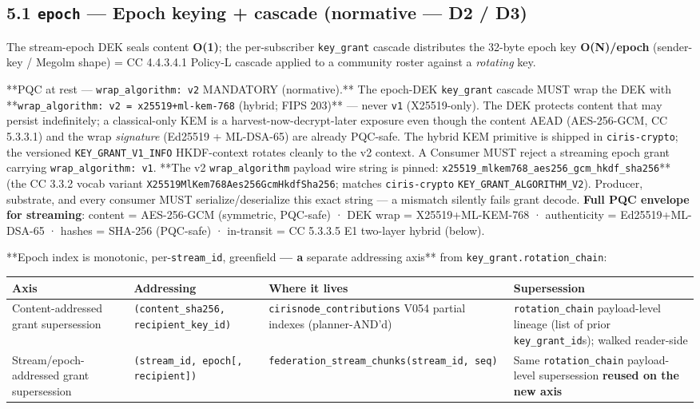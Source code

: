 \documentclass[11pt]{article}
\begin{document}
\subsection*{5.1 \texttt{epoch} — Epoch keying + cascade (normative — D2 / D3)}


The stream-epoch DEK seals content \textbf{O(1)}; the per-subscriber \texttt{key\_grant} cascade distributes the 32-byte epoch key \textbf{O(N)/epoch} (sender-key / Megolm shape) = CC 4.4.3.4.1 Policy-L cascade applied to a community roster against a \textit{rotating} key.


**PQC at rest — \texttt{wrap\_algorithm: v2} MANDATORY (normative).** The epoch-DEK \texttt{key\_grant} cascade MUST wrap the DEK with **\texttt{wrap\_algorithm: v2 = x25519+ml-kem-768} (hybrid; FIPS 203)** — never \texttt{v1} (X25519-only). The DEK protects content that may persist indefinitely; a classical-only KEM is a harvest-now-decrypt-later exposure even though the content AEAD (AES-256-GCM, CC 5.3.3.1) and the wrap \textit{signature} (Ed25519 + ML-DSA-65) are already PQC-safe. The hybrid KEM primitive is shipped in \texttt{ciris-crypto}; the versioned \texttt{KEY\_GRANT\_V1\_INFO} HKDF-context rotates cleanly to the v2 context. A Consumer MUST reject a streaming epoch grant carrying \texttt{wrap\_algorithm: v1}. **The v2 \texttt{wrap\_algorithm} payload wire string is pinned: \texttt{x25519\_mlkem768\_aes256\_gcm\_hkdf\_sha256}** (the CC 3.3.2 vocab variant \texttt{X25519MlKem768Aes256GcmHkdfSha256}; matches \texttt{ciris-crypto} \texttt{KEY\_GRANT\_ALGORITHM\_V2}). Producer, substrate, and every consumer MUST serialize/deserialize this exact string — a mismatch silently fails grant decode. \textbf{Full PQC envelope for streaming}: content = AES-256-GCM (symmetric, PQC-safe) · DEK wrap = X25519+ML-KEM-768 · authenticity = Ed25519+ML-DSA-65 · hashes = SHA-256 (PQC-safe) · in-transit = CC 5.3.3.5 E1 two-layer hybrid (below).


**Epoch index is monotonic, per-\texttt{stream\_id}, greenfield\textbf{ — a }separate addressing axis** from \texttt{key\_grant.rotation\_chain}:


{\scriptsize
\begin{longtable}{|p{4.0cm}|p{4.0cm}|p{4.0cm}|p{4.0cm}|}\hline
\textbf{Axis} & \textbf{Addressing} & \textbf{Where it lives} & \textbf{Supersession} \\ \hline\endhead
Content-addressed grant supersession & \texttt{(content\_sha256, recipient\_key\_id)} & \texttt{cirisnode\_contributions} V054 partial indexes (planner-AND'd) & \texttt{rotation\_chain} payload-level lineage (list of prior \texttt{key\_grant\_id}s); walked reader-side \\ \hline
Stream/epoch-addressed grant supersession & \texttt{(stream\_id, epoch[, recipient])} & \texttt{federation\_stream\_chunks(stream\_id, seq)} & Same \texttt{rotation\_chain} payload-level supersession \textbf{reused on the new axis} \\ \hline
\end{longtable}}
\end{document}
